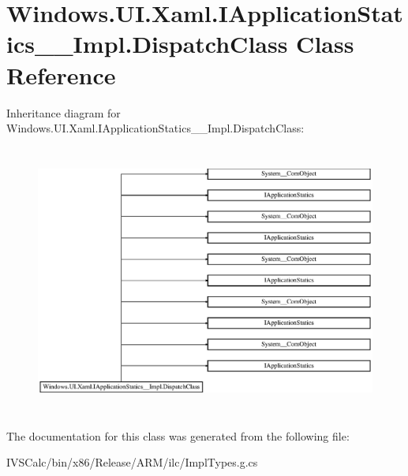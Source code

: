 \hypertarget{class_windows_1_1_u_i_1_1_xaml_1_1_i_application_statics_____impl_1_1_dispatch_class}{}\section{Windows.\+U\+I.\+Xaml.\+I\+Application\+Statics\+\_\+\+\_\+\+Impl.\+Dispatch\+Class Class Reference}
\label{class_windows_1_1_u_i_1_1_xaml_1_1_i_application_statics_____impl_1_1_dispatch_class}
Inheritance diagram for Windows.\+U\+I.\+Xaml.\+I\+Application\+Statics\+\_\+\+\_\+\+Impl.\+Dispatch\+Class\+:\begin{figure}[H]
\begin{center}
\leavevmode
\includegraphics[height=8.953488cm]{class_windows_1_1_u_i_1_1_xaml_1_1_i_application_statics_____impl_1_1_dispatch_class}
\end{center}
\end{figure}


The documentation for this class was generated from the following file\+:\begin{DoxyCompactItemize}
\item 
I\+V\+S\+Calc/bin/x86/\+Release/\+A\+R\+M/ilc/Impl\+Types.\+g.\+cs\end{DoxyCompactItemize}
